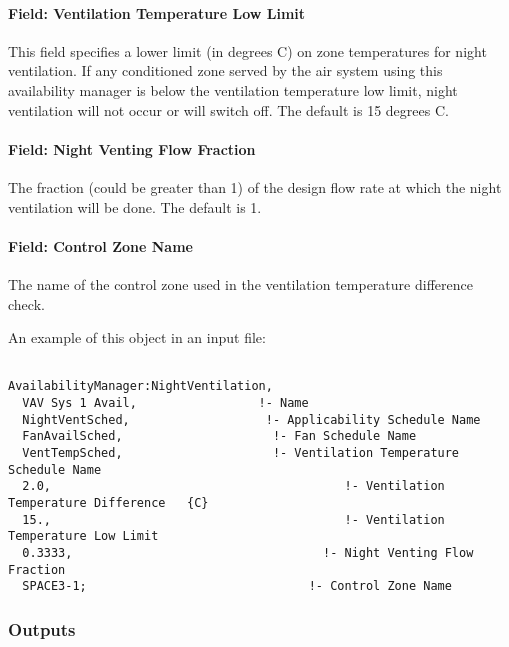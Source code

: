 \paragraph{Field: Ventilation Temperature Low Limit}\label{field-ventilation-temperature-low-limit}

This field specifies a lower limit (in degrees C) on zone temperatures for night ventilation. If any conditioned zone served by the air system using this availability manager is below the ventilation temperature low limit, night ventilation will not occur or will switch off. The default is 15 degrees C.

\paragraph{Field: Night Venting Flow Fraction}\label{field-night-venting-flow-fraction}

The fraction (could be greater than 1) of the design flow rate at which the night ventilation will be done. The default is 1.

\paragraph{Field: Control Zone Name}\label{field-control-zone-name-000}

The name of the control zone used in the ventilation temperature difference check.

An example of this object in an input file:

\begin{lstlisting}

AvailabilityManager:NightVentilation,
  VAV Sys 1 Avail,                 !- Name
  NightVentSched,                   !- Applicability Schedule Name
  FanAvailSched,                     !- Fan Schedule Name
  VentTempSched,                     !- Ventilation Temperature Schedule Name
  2.0,                                         !- Ventilation Temperature Difference   {C}
  15.,                                         !- Ventilation Temperature Low Limit
  0.3333,                                   !- Night Venting Flow Fraction
  SPACE3-1;                               !- Control Zone Name
\end{lstlisting}

\subsubsection{Outputs}\label{outputs-8-008}

